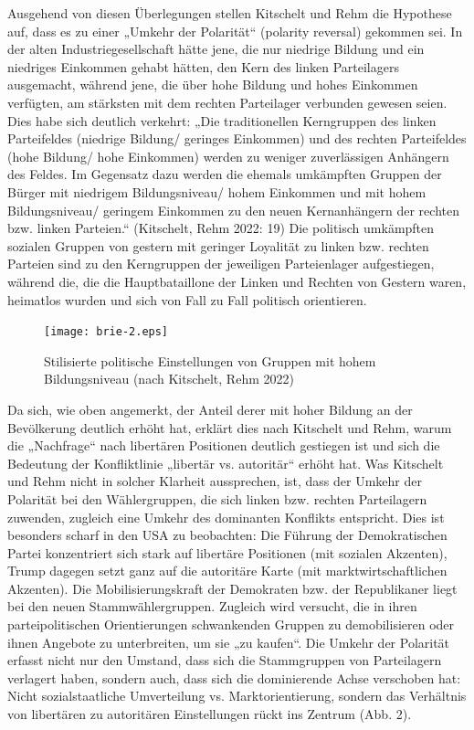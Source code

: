 \begin{multicols*}{2}
    Ausgehend von diesen Überlegungen stellen Kitschelt und Rehm die Hypothese auf, dass es zu einer „Umkehr der Polarität“ (polarity reversal) gekommen sei. In der alten Industriegesellschaft hätte jene, die nur niedrige Bildung und ein niedriges Einkommen gehabt hätten, den Kern des linken Parteilagers ausgemacht, während jene, die über hohe Bildung und hohes Einkommen verfügten, am stärksten mit dem rechten Parteilager verbunden gewesen seien. Dies habe sich deutlich verkehrt: „Die traditionellen Kerngruppen des linken Parteifeldes (niedrige Bildung/ geringes Einkommen) und des rechten Parteifeldes (hohe Bildung/ hohe Einkommen) werden zu weniger zuverlässigen Anhängern des Feldes. Im Gegensatz dazu werden die ehemals umkämpften Gruppen der Bürger mit niedrigem Bildungsniveau/ hohem Einkommen und mit hohem Bildungsniveau/ geringem Einkommen zu den neuen Kernanhängern der rechten bzw. linken Parteien.“ (Kitschelt, Rehm 2022: 19) Die politisch umkämpften sozialen Gruppen von gestern mit geringer Loyalität zu linken bzw. rechten Parteien sind zu den Kerngruppen der jeweiligen Parteienlager aufgestiegen, während die, die die Hauptbataillone der Linken und Rechten von Gestern waren, heimatlos wurden und sich von Fall zu Fall politisch orientieren.


    \begin{figure}
        \centering
        \caption{Stilisierte politische Einstellungen von Gruppen mit hohem Bildungsniveau (nach Kitschelt, Rehm 2022)}
        \texttt{[image: brie-2.eps]} 
    \end{figure}


   
    Da sich, wie oben angemerkt, der Anteil derer mit hoher Bildung an der Bevölkerung deutlich erhöht hat, erklärt dies nach Kitschelt und Rehm, warum die „Nachfrage“ nach libertären Positionen deutlich gestiegen ist und sich die Bedeutung der Konfliktlinie „libertär vs. autoritär“ erhöht hat. Was Kitschelt und Rehm nicht in solcher Klarheit aussprechen, ist, dass der Umkehr der Polarität bei den Wählergruppen, die sich linken bzw. rechten Parteilagern zuwenden, zugleich eine Umkehr des dominanten Konflikts entspricht. Dies ist besonders scharf in den USA zu beobachten: Die Führung der Demokratischen Partei konzentriert sich stark auf libertäre Positionen (mit sozialen Akzenten), Trump dagegen setzt ganz auf die autoritäre Karte (mit marktwirtschaftlichen Akzenten). Die Mobilisierungskraft der Demokraten bzw. der Republikaner liegt bei den neuen Stammwählergruppen. Zugleich wird versucht, die in ihren parteipolitischen Orientierungen schwankenden Gruppen zu demobilisieren oder ihnen Angebote zu unterbreiten, um sie „zu kaufen“. Die Umkehr der Polarität erfasst nicht nur den Umstand, dass sich die Stammgruppen von Parteilagern verlagert haben, sondern auch, dass sich die dominierende Achse verschoben hat: Nicht sozialstaatliche Umverteilung vs. Marktorientierung, sondern das Verhältnis von libertären zu autoritären Einstellungen rückt ins Zentrum (Abb. 2).


\end{multicols*}
